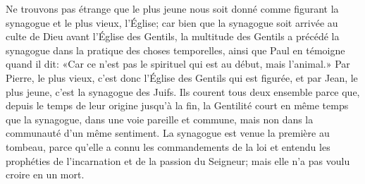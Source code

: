 Ne trouvons pas étrange
		que le plus jeune nous soit donné comme figurant la synagogue
	et le plus vieux, l’Église;
	car bien que la synagogue soit arrivée au culte de Dieu
		avant l’Église des Gentils,
	la multitude des Gentils a précédé la synagogue
		dans la pratique des choses temporelles,
	ainsi que Paul en témoigne quand il dit:
	«Car ce n’est pas le spirituel qui est au début, mais l’animal.»
Par Pierre, le plus vieux, c’est donc l’Église des Gentils qui est figurée,
	et par Jean, le plus jeune, c’est la synagogue des Juifs.
Ils courent tous deux ensemble
	parce que, depuis le temps de leur origine jusqu’à la fin,
	la Gentilité court en même temps que la synagogue,
	dans une voie pareille et commune,
		mais non dans la communauté d’un même sentiment.
La synagogue est venue la première au tombeau,
	parce qu’elle a connu les commandements de la loi
	et entendu les prophéties de l’incarnation et de la passion du Seigneur;
	mais elle n’a pas voulu croire en un mort.
